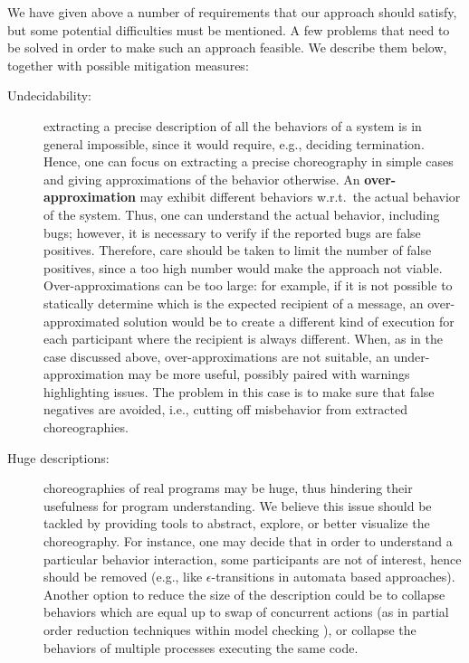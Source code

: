 We have given above a number of requirements that our approach 
should satisfy, but some potential difficulties must be mentioned. 
A few problems that need to be solved in order to make such
an approach feasible. We describe them below, together with possible
mitigation measures:

\begin{description}
\item[Undecidability:]
  extracting a precise description of all the behaviors of a system
  is in general impossible, since it would require, e.g., deciding
  termination.
  Hence, one can focus on extracting a precise choreography in
  simple cases and giving approximations of the behavior
  otherwise.
  An \textbf{over-approximation} may exhibit different behaviors
  w.r.t.\ the actual behavior of the system.
  Thus, one can understand the actual behavior, including bugs;
  however, it is necessary to verify if the reported bugs are false
  positives.
  Therefore, care should be taken to limit the number of
  false positives, since a too high number would make the approach
  not viable.
  Over-approximations can be too large: for example, if it is not
  possible to statically determine which is the expected recipient of a
  message, an over-approximated solution would be to create a different kind
  of execution for each participant where the recipient is always different.
  When, as in the case discussed above, over-approximations are not
  suitable, an under-approximation may be more useful, possibly
  paired with warnings highlighting issues.
  The problem in this case is to make sure that false negatives are
  avoided, i.e., cutting off misbehavior from extracted
  choreographies.

  \item[Huge descriptions:] choreographies of real programs may be
  huge, thus hindering their usefulness for program understanding.
  We believe this issue should be tackled by providing tools to
  abstract, explore, or better visualize the choreography. 
  For instance, one
  may decide that in order to understand a particular behavior interaction, 
  some participants are not of interest, hence should be
  removed (e.g., like $\epsilon$-transitions in automata based
  approaches). Another option to reduce the size of the description
  could be to collapse behaviors which are equal up to swap of
  concurrent actions (as in partial order reduction techniques
  within model checking \cite{God97}), or collapse the behaviors
  of multiple processes executing the same code.
\end{description}